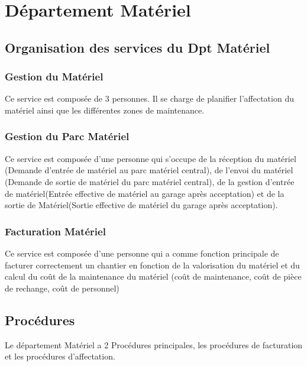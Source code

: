 \documentclass [a4paper] {report}
\begin{document}
\section{Département Matériel}
\subsection{Organisation des services du Dpt Matériel}


	\subsubsection{Gestion du Matériel}

	Ce service est composée de 3 personnes. Il se charge de planifier l'affectation du matériel ainsi que les différentes zones de maintenance.\\
	
	\subsubsection{Gestion du Parc Matériel}
	
	Ce service est composée d'une personne qui s'occupe de la réception du matériel (Demande d'entrée de matériel au parc matériel central), de l'envoi du matériel (Demande de sortie de matériel du parc matériel central), de la gestion d'entrée de matériel(Entrée effective de matériel au garage après acceptation) et de la sortie de Matériel(Sortie effective de matériel du garage après acceptation).
		
	\subsubsection{Facturation Matériel}
	Ce service est composée d'une personne qui a comme fonction principale de facturer correctement un chantier en fonction de la valorisation du matériel et du calcul du coût de la maintenance du matériel (coût de maintenance, coût de pièce de rechange, coût de personnel)\\
	
\subsection{Procédures}
	
Le département Matériel a 2 Procédures principales, les procédures de facturation et les procédures d'affectation.
\end{document}
